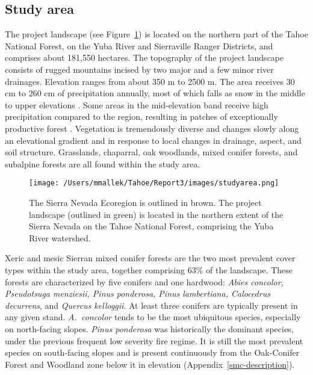 \subsection*{Study area}
The project landscape (see Figure~\ref{projectarea-ch3}) is located on the northern part of the Tahoe National Forest, on the Yuba River and Sierraville Ranger Districts, and comprises about 181,550 hectares. The topography of the project landscape consists of rugged mountains incised by two major and a few minor river drainages. Elevation ranges from about 350 m to 2500 m. The area receives 30 cm to 260 cm of precipitation annually, most of which falls as snow in the middle to upper elevations \citep{Storer1963}. Some areas in the mid-elevation band receive high precipitation compared to the region, resulting in patches of exceptionally productive forest \citep{Littell2012}. Vegetation is tremendously diverse and changes slowly along an elevational gradient and in response to local changes in drainage, aspect, and soil structure. Grasslands, chaparral, oak woodlands, mixed conifer forests, and subalpine forests are all found within the study area.

\begin{figure}
\centering
\texttt{[image: /Users/mmallek/Tahoe/Report3/images/studyarea.png]}
\caption{The Sierra Nevada Ecoregion is outlined in brown. The project landscape (outlined in green) is located in the northern extent of the Sierra Nevada on the Tahoe National Forest, comprising the Yuba River watershed.}
\label{projectarea-ch3}
\end{figure}

Xeric and mesic Sierran mixed conifer forests are the two most prevalent cover types within the study area, together comprising 63\% of the landscape. These forests are characterized by five conifers and one hardwood: \emph{Abies concolor, Pseudotsuga menziesii, Pinus ponderosa, Pinus lambertiana, Calocedrus decurrens}, and \emph{Quercus kelloggii}. At least three conifers are typically present in any given stand. \emph{A.~concolor} tends to be the most ubiquitous species, especially on north-facing slopes. \emph{Pinus ponderosa} was historically the dominant species, under the previous frequent low severity fire regime. It is still the most prevalent species on south-facing slopes and is present continuously from the Oak-Conifer Forest and Woodland zone below it in elevation (Appendix~\ref{smc-description}).


